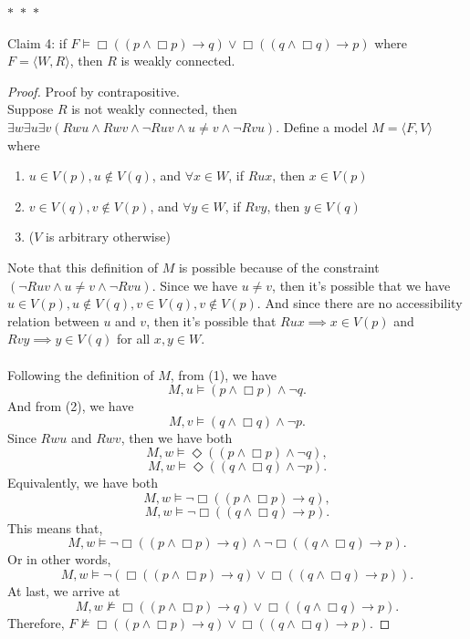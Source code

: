 \documentclass[12pt]{article}
\newcommand{\B}{\Box}
\newcommand{\D}{\Diamond}
\newcommand{\s}{\vDash}
\newcommand{\ns}{\nvDash}
\begin{document}
\noindent
\begin{center}
    $\ast$~$\ast$~$\ast$
\end{center}
Claim 4: if $F \vDash \B((p \land \B p) \to q) \lor \B((q \land \B q) \to p)$ where $F = \langle W, R \rangle$, then $R$ is weakly connected. 
\begin{proof} Proof by contrapositive.\\
    Suppose $R$ is not weakly connected, then $\exists w \exists u \exists v (Rwu \land Rwv \land \neg Ruv \land u \neq v \land \neg Rvu)$.
    Define a model $M = \langle F, V \rangle$ where
    \begin{enumerate}
        \item $u \in V(p), u \notin V(q)$, and $\forall x \in W$, if $Rux$, then $x \in V(p)$
        \item $v \in V(q), v \notin V(p)$, and $\forall y \in W$, if $Rvy$, then $y \in V(q)$
        \item ($V$ is arbitrary otherwise)
    \end{enumerate}
    Note that this definition of $M$ is possible because of the constraint $(\neg Ruv \land u \neq v \land \neg Rvu)$.
    Since we have $u \neq v$, then it's possible that we have $u \in V(p), u \notin V(q), v \in V(q), v \notin V(p)$.
    And since there are no accessibility relation between $u$ and $v$, then it's possible that $Rux \implies x \in V(p)$ and $Rvy \implies y \in V(q)$ for all $x, y \in W$.\\
    \\
    Following the definition of $M$, from (1), we have 
    $$M, u \s (p \land \B p) \land \neg q.$$
    And from (2), we have
    $$M, v \s (q \land \B q) \land \neg p.$$
    Since $Rwu$ and $Rwv$, then we have both
    $$M, w \s \D ((p \land \B p) \land \neg q),$$
    $$M, w \s \D ((q \land \B q) \land \neg p).$$
    Equivalently, we have both
    $$M, w \s \neg \B ((p \land \B p) \to q),$$
    $$M, w \s \neg \B ((q \land \B q) \to p).$$
    This means that, 
    $$M, w \s \neg \B ((p \land \B p) \to q) \land \neg \B ((q \land \B q) \to p).$$
    Or in other words, 
    $$M, w \s \neg(\B ((p \land \B p) \to q) \lor \B ((q \land \B q) \to p)).$$
    At last, we arrive at 
    $$M, w \ns \B ((p \land \B p) \to q) \lor \B ((q \land \B q) \to p).$$
    Therefore, $F \ns \B ((p \land \B p) \to q) \lor \B ((q \land \B q) \to p)$.

\end{proof}
\end{document}
